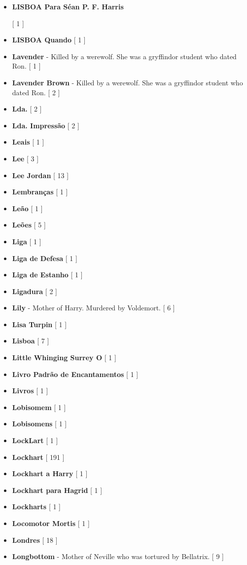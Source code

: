 \documentclass[a4paper]{article}
\begin{document}
{\begin{itemize}
	\item \hypertarget{L}{\textbf{LISBOA Para Séan P. F. Harris}} [ 1 ]
	\item \textbf{LISBOA Quando} [ 1 ]
	\item \textbf{Lavender} - Killed by a werewolf. She was a gryffindor student who dated Ron.  [ 1 ]
	\item \textbf{Lavender Brown} - Killed by a werewolf. She was a gryffindor student who dated Ron.  [ 2 ]
	\item \textbf{Lda.} [ 2 ]
	\item \textbf{Lda. Impressão} [ 2 ]
	\item \textbf{Leais} [ 1 ]
	\item \textbf{Lee} [ 3 ]
	\item \textbf{Lee Jordan} [ 13 ]
	\item \textbf{Lembranças} [ 1 ]
	\item \textbf{Leão} [ 1 ]
	\item \textbf{Leões} [ 5 ]
	\item \textbf{Liga} [ 1 ]
	\item \textbf{Liga de Defesa} [ 1 ]
	\item \textbf{Liga de Estanho} [ 1 ]
	\item \textbf{Ligadura} [ 2 ]
	\item \textbf{Lily} - Mother of Harry. Murdered by Voldemort. [ 6 ]
	\item \textbf{Lisa Turpin} [ 1 ]
	\item \textbf{Lisboa} [ 7 ]
	\item \textbf{Little Whinging Surrey O} [ 1 ]
	\item \textbf{Livro Padrão de Encantamentos} [ 1 ]
	\item \textbf{Livros} [ 1 ]
	\item \textbf{Lobisomem} [ 1 ]
	\item \textbf{Lobisomens} [ 1 ]
	\item \textbf{LockLart} [ 1 ]
	\item \textbf{Lockhart} [ 191 ]
	\item \textbf{Lockhart a Harry} [ 1 ]
	\item \textbf{Lockhart para Hagrid} [ 1 ]
	\item \textbf{Lockharts} [ 1 ]
	\item \textbf{Locomotor Mortis} [ 1 ]
	\item \textbf{Londres} [ 18 ]
	\item \textbf{Longbottom} - Mother of Neville who was tortured by Bellatrix. [ 9 ]

\end{itemize}}
\end{document}
